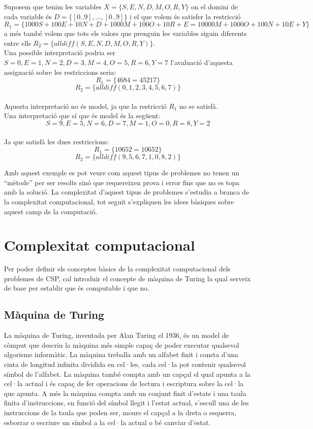 Suposem que tenim les variables \( X = \{S, E, N, D, M, O, R, Y\} \) on el domini de cada variable és \( D = \{[0 .. 9], \ldots, [0 .. 9]\} \) i el que volem és satisfer la restricció \( R_1 = \{1000S + 100E + 10N + D + 1000M + 100O + 10R + E = 10000M + 1000O + 100N + 10E + Y\} \) a més també volem que tots els valors que prenguin les variables siguin diferents entre ells \( R_2 = \{alldiff(S, E, N, D, M, O, R, Y)\}\).\\
Una possible interpretació podria ser \(S=0, E=1, N=2, D=3, M=4, O=5, R=6, Y=7\) l'avaluació d'aquesta assignació sobre les restriccions seria:\\
$$ R_1 = \{4684 = 45217\} $$
$$ R_2 = \{alldiff(0, 1, 2, 3, 4, 5, 6, 7)\}$$\\
Aquesta interpretació no és model, ja que la restricció $R_1$ no se satisfà.\\
Una interpretació que sí que és model és la següent:
$$ S=9, E=5, N=6, D=7, M=1, O=0, R=8, Y=2 $$\\
Ja que satisfà les dues restriccions:\\
$$ R_1 = \{10652 = 10652\} $$
$$ R_2 = \{alldiff(9, 5, 6, 7, 1, 0, 8, 2)\}$$

Amb aquest exemple es pot veure com aquest tipus de problemes no tenen un ``mètode'' per ser resolts sinó que requereixen prova i error fins que no es topa amb la solució. La complexitat d'aquest tipus de problemes s'estudia a branca de la complexitat computacional, tot seguit s'expliquen les idees bàsiques sobre aquest camp de la computació.

\section{Complexitat computacional}
Per poder definir els conceptes bàsics de la complexitat computacional dels problemes de CSP, cal introduir el concepte de màquina de Turing la qual serveix de base per establir que és computable i que no.

\subsection{Màquina de Turing}
La màquina de Turing, inventada per Alan Turing el 1936, és un model de còmput que descriu la màquina més simple capaç de poder executar qualsevol algorisme informàtic. La màquina treballa amb un alfabet finit i consta d'una cinta de longitud infinita dividida en cel·les, cada cel·la pot contenir qualsevol símbol de l'alfabet. La màquina també compta amb un capçal el qual apunta a la cel·la actual i és capaç de fer operacions de lectura i escriptura sobre la cel·la que apunta. A més la màquina compta amb un conjunt finit d'estats i una taula finita d'instruccions, en funció del símbol llegit i l'estat actual, s'escull una de les instruccions de la taula que poden ser, moure el capçal a la dreta o esquerra, esborrar o escriure un símbol a la cel·la actual o bé canviar d'estat.

